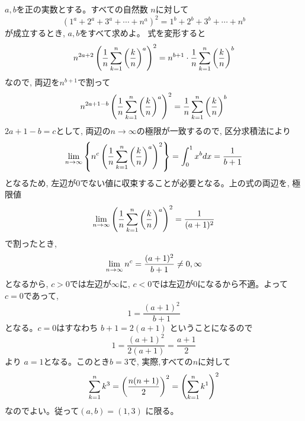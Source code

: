 $a,b$を正の実数とする。すべての自然数	$n$に対して
\[(1^a+2^a+3^a+\cdots +n^a)^2=1^b+2^b+3^b+\cdots +n^b\]
が成立するとき, $a,b$をすべて求めよ。
\enthm
式を変形すると
\[n^{2a+2}\left(\dfrac{1}{n}\displaystyle\sum_{k=1}^{n}\left(\dfrac{k}{n}\right)^a\right)^2=n^{b+1}\cdot\dfrac{1}{n}\displaystyle\sum_{k=1}^n\left(\dfrac{k}{n}\right)^b\]
なので, 両辺を$n^{b+1}$で割って
\[ n^{2a+1-b}\left(\dfrac{1}{n}\displaystyle\sum_{k=1}^{n}\left(\dfrac{k}{n}\right)^a\right)^2=\dfrac{1}{n}\displaystyle\sum_{k=1}^n\left(\dfrac{k}{n}\right)^b\]
$2a+1-b=c$として, 両辺の$n\to \infty$の極限が一致するので, 区分求積法により
\[\displaystyle\lim_{n\to \infty} \left\{n^c\left(\dfrac{1}{n}\displaystyle\sum_{k=1}^{n}\left(\dfrac{k}{n}\right)^a\right)^2\right\}=\displaystyle\int_0^1 x^b dx = \dfrac{1}{b+1}\]
となるため, 左辺が0でない値に収束することが必要となる。上の式の両辺を, 極限値
\[\displaystyle\lim_{n\to \infty} \left(\dfrac{1}{n}\displaystyle\sum_{k=1}^n\left(\dfrac{k}{n}\right)^a\right)^{2} = \dfrac{1}{(a+1)^2}\]
で割ったとき,
\[\displaystyle\lim_{n\to \infty} n^c = \dfrac{(a+1)^2}{b+1}\neq 0, \infty\]
となるから, $c>0$では左辺が$\infty$に, $c<0$では左辺が$0$になるから不適。よって$c=0$であって,
\[1=\dfrac{(a+1)^2}{b+1}\]
となる。$c=0$はすなわち $b+1=2(a+1)$ ということになるので
\[1=\dfrac{(a+1)^2}{2(a+1)}=\dfrac{a+1}{2}\]
より $a=1$となる。このとき$b=3$で, 実際,すべての$n$に対して
\[\displaystyle\sum_{k=1}^n k^3=\left(\dfrac{n(n+1)}{2}\right)^2=\left(\displaystyle\sum_{k=1}^n k^1\right)^2\]
なのでよい。従って$(a,b)=(1,3)$ に限る。